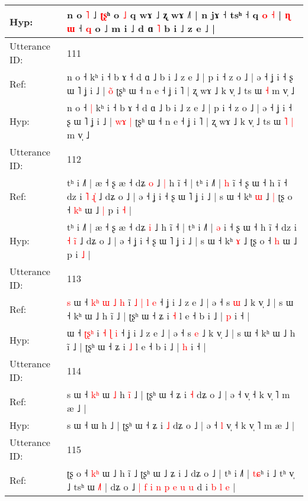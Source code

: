 \documentclass[10pt]{article}
\DeclareRobustCommand{\hl}[1]{{\textcolor{red}{#1}}}
\begin{document}
\begin{longtable}{ll}
 \\
Hyp: & n o\hl{}\hl{} \hl{}\hl{˥} ˩\hl{}\hl{} \hl{ʈ}\hl{ʂ}ʰ o \hl{˩} q\hl{} wɤ ˩\hl{}\hl{} ʐ wɤ ˩˥ | n jɤ\hl{}\hl{}\hl{}\hl{}\hl{}\hl{} ˧\hl{}\hl{} tsʰ\hl{}\hl{} ˧ q\hl{} \hl{}\hl{o} \hl{˧} | \hl{ɳ} \hl{ɯ} ˧ \hl{q} o ˩ m i ˩\hl{}\hl{} d ɑ \hl{˥} b i ˩ z e ˩ |
 \\
\midrule
Utterance ID: & 111 \\
Ref: & n o ˧\hl{}\hl{} kʰ i ˧ b ɤ ˧ d ɑ ˩ b i ˩ z e ˩ | p i ˧ z o ˩ | ə ˧ ʝ i ˧ ʂ ɯ ˥ ʝ i ˩ | \hl{}\hl{}\hl{o}\hl{̃} ʈʂʰ ɯ ˧ n e ˧ ʝ i ˥ | ʐ wɤ ˩ k v̩ ˩ ts ɯ\hl{}\hl{} \hl{˧} m v̩ ˩
 \\
Hyp: & n o ˧\hl{ }\hl{|} kʰ i ˧ b ɤ ˧ d ɑ ˩ b i ˩ z e ˩ | p i ˧ z o ˩ | ə ˧ ʝ i ˧ ʂ ɯ ˥ ʝ i ˩ | \hl{w}\hl{ɤ}\hl{ }\hl{|} ʈʂʰ ɯ ˧ n e ˧ ʝ i ˥ | ʐ wɤ ˩ k v̩ ˩ ts ɯ\hl{ }\hl{˥} \hl{|} m v̩ ˩
 \\
\midrule
Utterance ID: & 112 \\
Ref: & tʰ i ˩˥ | æ ˧ ʂ æ ˧ dʑ \hl{o} ˩\hl{ }\hl{|} h ĩ ˧ | tʰ i ˩˥ | \hl{h} i\hl{̃} ˧ ʂ ɯ ˧ h ĩ ˧ dz i \hl{˥} \hl{ɻ}\hl{̍} ˩ dʑ o ˩ | ə ˧ ʝ i ˧ ʂ ɯ ˥ ʝ i ˩ | s ɯ ˧ kʰ \hl{ɯ} ˩\hl{ }\hl{|} ʈʂ o ˧ \hl{k}\hl{ʰ} ɯ ˩\hl{ }\hl{|} p i \hl{˧} |
 \\
Hyp: & tʰ i ˩˥ | æ ˧ ʂ æ ˧ dʑ \hl{i} ˩\hl{}\hl{} h ĩ ˧ | tʰ i ˩˥ | \hl{ə} i\hl{} ˧ ʂ ɯ ˧ h ĩ ˧ dz i \hl{˧} \hl{i}\hl{̃} ˩ dʑ o ˩ | ə ˧ ʝ i ˧ ʂ ɯ ˥ ʝ i ˩ | s ɯ ˧ kʰ \hl{ɤ} ˩\hl{}\hl{} ʈʂ o ˧ \hl{}\hl{h} ɯ ˩\hl{}\hl{} p i \hl{˩} |
 \\
\midrule
Utterance ID: & 113 \\
Ref: & \hl{s}\hl{ }ɯ ˧\hl{ }\hl{k}\hl{ʰ}\hl{ }\hl{ɯ} \hl{˩}\hl{ }\hl{h} i\hl{̃}\hl{ }\hl{˩} \hl{|} \hl{l} \hl{e} ˧ ʝ i ˩ z e ˩ | ə ˧ s \hl{ɯ} ˩ k v̩ ˩ | s ɯ ˧ kʰ ɯ ˩ h ĩ ˩ | ʈʂʰ ɯ ˧ ʑ i \hl{˧} l e ˧ b i ˩ | \hl{p} i ˧ |
 \\
Hyp: & \hl{}\hl{}ɯ ˧\hl{}\hl{}\hl{}\hl{}\hl{} \hl{ʈ}\hl{ʂ}\hl{ʰ} i\hl{}\hl{}\hl{} \hl{˧} \hl{ɭ} \hl{i} ˧ ʝ i ˩ z e ˩ | ə ˧ s \hl{e} ˩ k v̩ ˩ | s ɯ ˧ kʰ ɯ ˩ h ĩ ˩ | ʈʂʰ ɯ ˧ ʑ i \hl{˩} l e ˧ b i ˩ | \hl{h} i ˧ |
 \\
\midrule
Utterance ID: & 114 \\
Ref: & s ɯ ˧\hl{ }\hl{k}\hl{ʰ} ɯ\hl{ }\hl{˩} h\hl{ }\hl{i}\hl{̃} ˩ | ʈʂʰ ɯ ˧ ʑ i \hl{˧} dʑ o ˩ | ə ˧\hl{}\hl{} v̩ ˧ k v̩ ˥ m æ ˩ |
 \\
Hyp: & s ɯ ˧\hl{}\hl{}\hl{} ɯ\hl{}\hl{} h\hl{}\hl{}\hl{} ˩ | ʈʂʰ ɯ ˧ ʑ i \hl{˩} dʑ o ˩ | ə ˧\hl{ }\hl{l} v̩ ˧ k v̩ ˥ m æ ˩ |
 \\
\midrule
Utterance ID: & 115 \\
Ref: & ʈʂ\hl{} o ˧ \hl{k}\hl{ʰ} ɯ ˩ h ĩ ˩ ʈʂʰ ɯ ˩ ʑ i ˩ dʑ o ˩ | tʰ i ˩˥ | \hl{t}\hl{ɕ}ʰ i ˩ tʰ v̩ ˩ tsʰ ɯ \hl{˩}˥ | dʑ o ˩\hl{ }\hl{|}\hl{ }\hl{f} \hl{i} \hl{n} \hl{p}\hl{ }\hl{e} \hl{u} \hl{u} d i\hl{ }\hl{b}\hl{ }\hl{l} \hl{e} |

\end{longtable}
\end{document}
